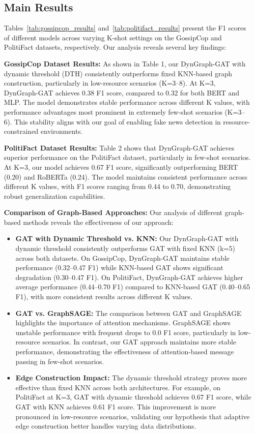 \documentclass[conference]{IEEEtran}
\begin{document}
\subsection{Main Results}
\label{subsec:results}

Tables~\ref{tab:gossipcop_results} and~\ref{tab:politifact_results} present the F1 scores of different models across varying K-shot settings on the GossipCop and PolitiFact datasets, respectively. Our analysis reveals several key findings:

\textbf{GossipCop Dataset Results:} As shown in Table 1, our DynGraph-GAT with dynamic threshold (DTH) consistently outperforms fixed KNN-based graph construction, particularly in low-resource scenarios (K=3--8). At K=3, DynGraph-GAT achieves 0.38 F1 score, compared to 0.32 for both BERT and MLP. The model demonstrates stable performance across different K values, with performance advantages most prominent in extremely few-shot scenarios (K=3--6). This stability aligns with our goal of enabling fake news detection in resource-constrained environments.

\textbf{PolitiFact Dataset Results:} Table 2 shows that DynGraph-GAT achieves superior performance on the PolitiFact dataset, particularly in few-shot scenarios. At K=3, our model achieves 0.67 F1 score, significantly outperforming BERT (0.20) and RoBERTa (0.24). The model maintains consistent performance across different K values, with F1 scores ranging from 0.44 to 0.70, demonstrating robust generalization capabilities.

\textbf{Comparison of Graph-Based Approaches:} Our analysis of different graph-based methods reveals the effectiveness of our approach:
\begin{itemize}
    \item \textbf{GAT with Dynamic Threshold vs. KNN:} Our DynGraph-GAT with dynamic threshold consistently outperforms GAT with fixed KNN (k=5) across both datasets. On GossipCop, DynGraph-GAT maintains stable performance (0.32--0.47 F1) while KNN-based GAT shows significant degradation (0.30--0.47 F1). On PolitiFact, DynGraph-GAT achieves higher average performance (0.44--0.70 F1) compared to KNN-based GAT (0.40--0.65 F1), with more consistent results across different K values.
    \item \textbf{GAT vs. GraphSAGE:} The comparison between GAT and GraphSAGE highlights the importance of attention mechanisms. GraphSAGE shows unstable performance with frequent drops to 0.0 F1 score, particularly in low-resource scenarios. In contrast, our GAT approach maintains more stable performance, demonstrating the effectiveness of attention-based message passing in few-shot scenarios.
    \item \textbf{Edge Construction Impact:} The dynamic threshold strategy proves more effective than fixed KNN across both architectures. For example, on PolitiFact at K=3, GAT with dynamic threshold achieves 0.67 F1 score, while GAT with KNN achieves 0.61 F1 score. This improvement is more pronounced in low-resource scenarios, validating our hypothesis that adaptive edge construction better handles varying data distributions.
\end{itemize}
\end{document}
